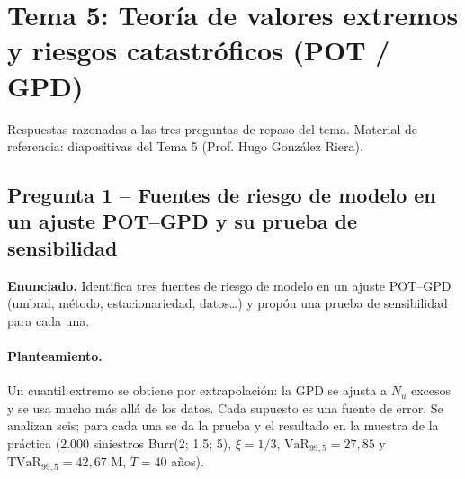 \documentclass[a4paper,12pt]{article}
\newcommand{\euro}{\texteuro}
\newcommand{\VaR}{\mathrm{VaR}}
\newcommand{\TVaR}{\mathrm{TVaR}}
\begin{document}
\restoregeometry
\newpage
{}
\setcounter{page}{1}

\section{Tema 5: Teoría de valores extremos y riesgos catastróficos (POT / GPD)}
\label{sec:tema5repaso}
\noindent
Respuestas razonadas a las tres preguntas de repaso del tema. Material de referencia: diapositivas del Tema 5 (Prof. Hugo González Riera).

\subsection{Pregunta 1 -- Fuentes de riesgo de modelo en un ajuste POT--GPD y su prueba de sensibilidad}

\noindent\textbf{Enunciado.} Identifica tres fuentes de riesgo de modelo en un ajuste POT--GPD (umbral, m\'etodo, estacionariedad, datos\dots) y prop\'on una prueba de sensibilidad para cada una.

\paragraph{Planteamiento.} Un cuantil extremo se obtiene por extrapolaci\'on: la GPD se ajusta a $N_u$ excesos y se usa mucho m\'as all\'a de los datos. Cada supuesto es una fuente de error. Se analizan seis; para cada una se da la prueba y el resultado en la muestra de la pr\'actica (2.000 siniestros Burr(2; 1,5; 5), $\xi=1/3$, $\VaR_{99,5}=27{,}85$ y $\TVaR_{99,5}=42{,}67$ M\euro, $T=40$ a\~nos).
\end{document}
